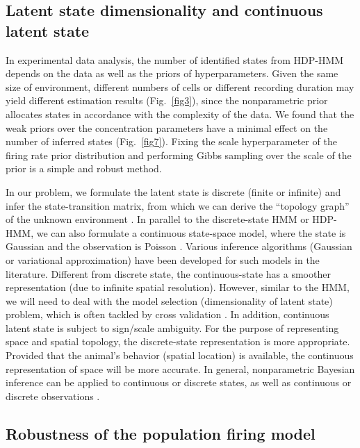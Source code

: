 \subsection{Latent state dimensionality and continuous latent state}

In experimental data analysis, the number of identified states from
HDP-HMM depends on the data as well as the priors of
hyperparameters. Given the same size of environment, different numbers
of cells or different recording duration may yield different
estimation results (Fig.~\ref{fig3}), since the nonparametric prior
allocates states in accordance with the complexity of the data. We
found that the weak priors over the concentration parameters have a
minimal effect on the number of inferred states
(Fig.~\ref{fig7}). Fixing the scale hyperparameter of the firing rate
prior distribution and performing Gibbs sampling over the scale of the
prior is a simple and robust method.


 
In our problem, we formulate the latent state is discrete (finite or
infinite) and infer the state-transition matrix, from which we can
derive the ``topology graph'' of the unknown environment
\citep{Chen12a,Chen14}. In parallel to the discrete-state HMM or
HDP-HMM, we can also formulate a continuous state-space model, where
the state is Gaussian and the observation is Poisson
\citep{Brown98,Smith03,Yu09,Buesing12}. Various inference algorithms
(Gaussian or variational approximation) have been developed for such
models in the literature. Different from discrete state, the
continuous-state has a smoother representation (due to infinite
spatial resolution). However, similar to the HMM, we will need to deal
with the model selection (dimensionality of latent state) problem,
which is often tackled by cross validation \citep{Yu09}. In addition,
continuous latent state is subject to sign/scale ambiguity. For the
purpose of representing space and spatial topology, the discrete-state
representation is more appropriate. Provided that the animal's
behavior (spatial location) is available, the continuous
representation of space will be more accurate. In general,
nonparametric Bayesian inference can be applied to continuous or
discrete states, as well as continuous or discrete observations
\citep{Teh06,van08,Fox08,Fox10,Chen15Book}.



\subsection{Robustness of the population firing model}

